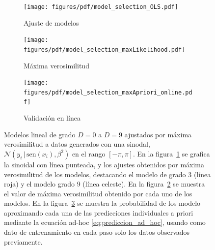 \documentclass[a4paper,11pt]{book}
\newcommand{\N}{\mathcal{N}}
\theoremstyle{definition}
\begin{document}
\begin{figure}[ht!] \centering
  \begin{subfigure}[t]{0.32\textwidth}
  \centering
  \texttt{[image: figures/pdf/model\_selection\_OLS.pdf]}
  \caption{Ajuste de modelos}
  \label{fig:model_selection_OLS}
  \end{subfigure}
  \begin{subfigure}[t]{0.32\textwidth}
  \centering
  \texttt{[image: figures/pdf/model\_selection\_maxLikelihood.pdf]}
  \caption{M\'axima verosimilitud}
  \label{fig:model_selection_maxLikelihood}
  \end{subfigure}
  \begin{subfigure}[t]{0.32\textwidth}
  \centering
  \texttt{[image: figures/pdf/model\_selection\_maxApriori\_online.pdf]}
  \caption{Validaci\'on en l\'inea}
  \label{fig:model_selection_maxApriori_online}
  \end{subfigure}
  \caption{Modelos lineal de grado $D=0$ a $D=9$ ajustados por m\'axima verosimilitud a datos generados con una sinodal, $\N(y_i \,| \, \text{sen}(x_i), \beta^2)$ en el rango $[-\pi,\pi]$.
  En la figura~\ref{fig:model_selection_OLS} se grafica la sinoidal con l\'inea punteada, y los ajustes obtenidos por m\'axima verosimilitud de los modelos, destacando el modelo de grado 3 (l\'inea roja) y el modelo grado 9 (l\'inea celeste).
  En la figura~\ref{fig:model_selection_maxLikelihood} se muestra el valor de m\'axima verosimilitud obtenido por cada uno de los modelos.
  En la figura~\ref{fig:model_selection_maxApriori_online} se muestra la probabilidad de los modelo aproximando cada una de las predicciones individuales a priori mediante la ecuaci\'on ad-hoc \eqref{eq:prediccion_ad_hoc}, usando como dato de entrenamiento en cada paso solo los datos observados previamente.
   }
  \label{fig:overfitting}
\end{figure}

\end{document}
